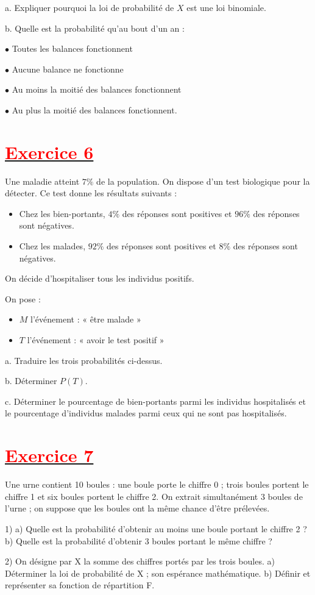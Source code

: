 \documentclass[12pt]{article}
\begin{document}
    a. Expliquer pourquoi la loi de probabilité de $X$ est une loi binomiale.
    
    b. Quelle est la probabilité qu’au bout d’un an :
    
        $\bullet$ Toutes les balances fonctionnent
        
        $\bullet$ Aucune balance ne fonctionne
        
        $\bullet$ Au moins la moitié des balances fonctionnent
        
        $\bullet$ Au plus la moitié des balances fonctionnent.

\section*{\underline{\textbf{\textcolor{red}{Exercice 6}}}}
Une maladie atteint $7\%$ de la population. On dispose d’un test biologique pour la détecter. Ce test donne les résultats suivants :
\begin{itemize}
    \item Chez les bien-portants, $4\%$ des réponses sont positives et $96\%$ des réponses sont négatives.
    \item Chez les malades, $92\%$ des réponses sont positives et $8\%$ des réponses sont négatives.
\end{itemize}

On décide d’hospitaliser tous les individus positifs.

On pose :
\begin{itemize}
    \item $M$ l’événement : « être malade »
    \item $T$ l’événement : « avoir le test positif »
\end{itemize}

a. Traduire les trois probabilités ci-dessus.

b. Déterminer $P(T)$.

c. Déterminer le pourcentage de bien-portants parmi les individus hospitalisés et le pourcentage d’individus malades parmi ceux qui ne sont pas hospitalisés.

\section*{\underline{\textbf{\textcolor{red}{Exercice 7}}}}
Une urne contient 10 boules : une boule porte le chiffre 0 ; trois boules portent le chiffre 1 et six boules portent le chiffre 2. On extrait simultanément 3 boules de l’urne ; on suppose que les boules ont la même chance d’être prélevées.

1) 
a) Quelle est la probabilité d’obtenir au moins une boule portant le chiffre 2 ?
b) Quelle est la probabilité d’obtenir 3 boules portant le même chiffre ?

2) On désigne par X la somme des chiffres portés par les trois boules.
a) Déterminer la loi de probabilité de X ; son espérance mathématique.
b) Définir et représenter sa fonction de répartition F.
\end{document}
